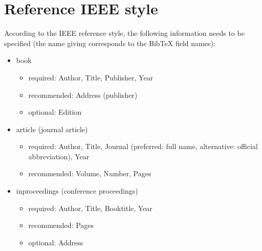 \documentclass{ISMA_USD2020}
\begin{document}
\section{Reference IEEE style}
According to the IEEE reference style, the following information needs to be specified (the name giving corresponds to the BibTeX field names):
\begin{itemize}
  \item book
  	\begin{itemize}
  		\item required: Author, Title, Publisher, Year
  		\item recommended: Address (publisher)
  		\item optional: Edition
  	\end{itemize}
  \item article (journal article)
  	\begin{itemize}
		\item required: Author, Title, Journal (preferred: full name, alternative: official abbreviation), Year
		\item recommended: Volume, Number, Pages
	\end{itemize}  
  \item inproceedings (conference proceedings)
  	\begin{itemize}
		\item required: Author, Title, Booktitle, Year
		\item recommended: Pages
		\item optional: Address
	\end{itemize}
\end{itemize}
\end{document}

